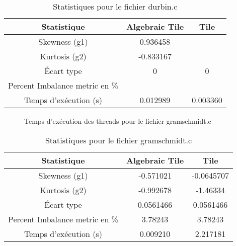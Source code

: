 \documentclass{article}
\begin{document}
\begin{table}[htbp]
  \centering
  \caption{Statistiques pour le fichier durbin.c}
  \begin{tabular}{|c|c|c|}
    \hline
    Statistique & Algebraic Tile & Tile \\ 
    \hline
    Skewness (g1) & 0.936458 &  \\ 
    Kurtosis (g2) & -0.833167 &  \\ 
    Écart type & 0 & 0 \\ 
    Percent Imbalance metric en \% &  &  \\ 
    Temps d'exécution (s) &  0.012989      &  0.003360    \\ 
    \hline
  \end{tabular}
\end{table}
\newpage

\begin{figure}
  \centering
  \caption{Temps d'exécution des threads pour le fichier gramschmidt.c}
  \label{fig:gramschmidt.c}
\end{figure}

\begin{table}[htbp]
  \centering
  \caption{Statistiques pour le fichier gramschmidt.c}
  \begin{tabular}{|c|c|c|}
    \hline
    Statistique & Algebraic Tile & Tile \\ 
    \hline
    Skewness (g1) & -0.571021 & -0.0645707 \\ 
    Kurtosis (g2) & -0.992678 & -1.46334 \\ 
    Écart type & 0.0561466 & 0.0561466 \\ 
    Percent Imbalance metric en \% & 3.78243 & 3.78243 \\ 
    Temps d'exécution (s) &  0.009210 &  2.217181    \\ 
    \hline
  \end{tabular}
\end{table}
\newpage

  
\end{document}
